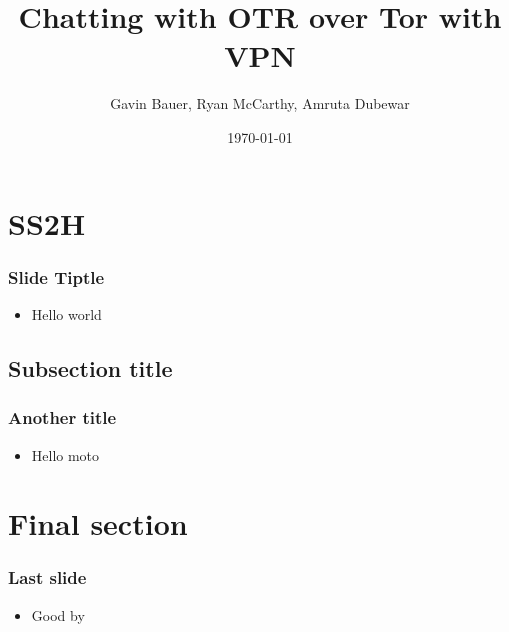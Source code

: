 \documentclass{beamer}
\title{Chatting with OTR over Tor with VPN}
\author{Gavin Bauer, Ryan McCarthy, Amruta Dubewar}
\date{\today}
\begin{document}
\begin{frame}
\maketitle
\end{frame}
\section{SS2H}
\begin{frame}
\frametitle{Slide Tiptle}
\begin{itemize}
\item Hello world
\end{itemize}
\end{frame}
\subsection{Subsection title}
\begin{frame}
\frametitle{Another title}
\begin{itemize}
\item Hello moto
\end{itemize}
\end{frame}
\section{Final section}
\begin{frame}
\frametitle{Last slide}
\begin{itemize}
\item Good by
\end{itemize}
\end{frame}
\end{document}
